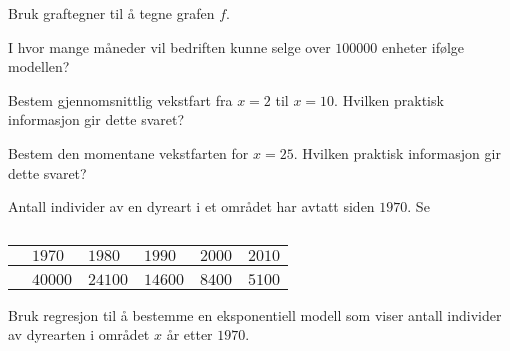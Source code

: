 \begin{oppgaver}
   Bruk graftegner til å tegne grafen $f$.
\end{oppgaver}

\begin{oppgaver}
   I hvor mange måneder vil bedriften kunne selge over $\num{100000}$
    enheter ifølge modellen?
\end{oppgaver}

\begin{oppgaver}
   Bestem gjennomsnittlig vekstfart fra $x = 2$ til $x = 10$. Hvilken
    praktisk informasjon gir dette svaret?
\end{oppgaver}

\begin{oppgaver}
   Bestem den momentane vekstfarten for $x = 25$. Hvilken praktisk
    informasjon gir dette svaret?
\end{oppgaver}


\Oppgave[4]

Antall individer av en dyreart i et området har avtatt siden $1970$. Se

\begin{table}[H]
    \centering
    \caption{}
    \label{tab:del-1-oppgave-1.4}
    \begin{tabularx}{\textwidth}{| l | *{5}{Y|} } \hline
              &    $1970$     &    $1980$     &    $1990$     &    $2000$    &    $2010$ \\ \hline
          &               &               &               &
                            &  \\[-0.02cm]
       &  &  &  &  &  \\
        \hline
    \end{tabularx}
\end{table}

\begin{oppgaver}
   Bruk regresjon til å bestemme en eksponentiell modell som viser
    antall individer av dyrearten i området $x$ år etter $1970$.
    \label{delopg:del-1-oppgave-2.3a}
\end{oppgaver}

